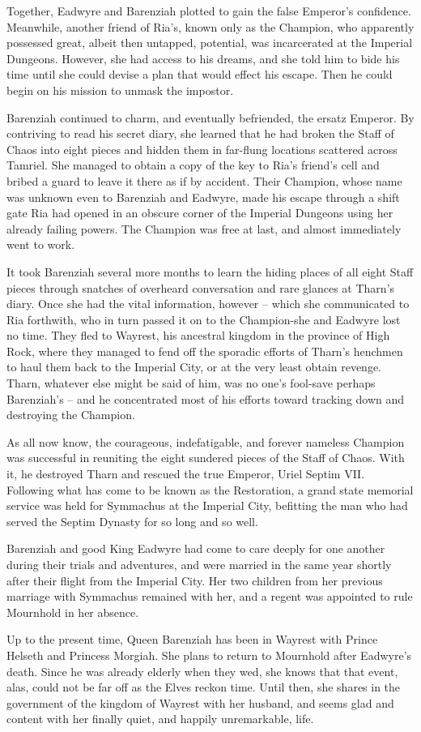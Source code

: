 Together, Eadwyre and Barenziah plotted to gain the false Emperor's confidence. Meanwhile, another friend of Ria's, known only as the Champion, who apparently possessed great, albeit then untapped, potential, was incarcerated at the Imperial Dungeons. However, she had access to his dreams, and she told him to bide his time until she could devise a plan that would effect his escape. Then he could begin on his mission to unmask the impostor.

Barenziah continued to charm, and eventually befriended, the ersatz Emperor. By contriving to read his secret diary, she learned that he had broken the Staff of Chaos into eight pieces and hidden them in far-flung locations scattered across Tamriel. She managed to obtain a copy of the key to Ria's friend's cell and bribed a guard to leave it there as if by accident. Their Champion, whose name was unknown even to Barenziah and Eadwyre, made his escape through a shift gate Ria had opened in an obscure corner of the Imperial Dungeons using her already failing powers. The Champion was free at last, and almost immediately went to work.

It took Barenziah several more months to learn the hiding places of all eight Staff pieces through snatches of overheard conversation and rare glances at Tharn's diary. Once she had the vital information, however -- which she communicated to Ria forthwith, who in turn passed it on to the Champion-she and Eadwyre lost no time. They fled to Wayrest, his ancestral kingdom in the province of High Rock, where they managed to fend off the sporadic efforts of Tharn's henchmen to haul them back to the Imperial City, or at the very least obtain revenge. Tharn, whatever else might be said of him, was no one's fool-save perhaps Barenziah's -- and he concentrated most of his efforts toward tracking down and destroying the Champion.

As all now know, the courageous, indefatigable, and forever nameless Champion was successful in reuniting the eight sundered pieces of the Staff of Chaos. With it, he destroyed Tharn and rescued the true Emperor, Uriel Septim VII. Following what has come to be known as the Restoration, a grand state memorial service was held for Symmachus at the Imperial City, befitting the man who had served the Septim Dynasty for so long and so well.

Barenziah and good King Eadwyre had come to care deeply for one another during their trials and adventures, and were married in the same year shortly after their flight from the Imperial City. Her two children from her previous marriage with Symmachus remained with her, and a regent was appointed to rule Mournhold in her absence.

Up to the present time, Queen Barenziah has been in Wayrest with Prince Helseth and Princess Morgiah. She plans to return to Mournhold after Eadwyre's death. Since he was already elderly when they wed, she knows that that event, alas, could not be far off as the Elves reckon time. Until then, she shares in the government of the kingdom of Wayrest with her husband, and seems glad and content with her finally quiet, and happily unremarkable, life.